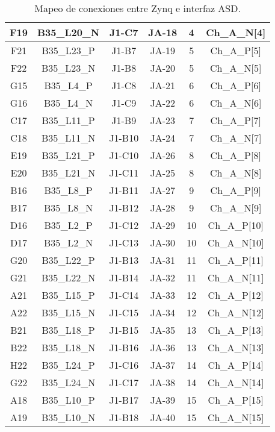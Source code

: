 \begin{table}[]
{\begin{tabular}{|c|c|c|c|c|c|}
				F19 & B35\_L20\_N & J1-C7  & JA-18 & 4  & Ch\_A\_N{[}4{]}  \\ \hline
				\rowcolor[HTML]{D9E1F2} 
				F21 & B35\_L23\_P & J1-B7  & JA-19 & 5  & Ch\_A\_P{[}5{]}  \\ \hline
				F22 & B35\_L23\_N & J1-B8  & JA-20 & 5  & Ch\_A\_N{[}5{]}  \\ \hline
				\rowcolor[HTML]{D9E1F2} 
				G15 & B35\_L4\_P  & J1-C8  & JA-21 & 6  & Ch\_A\_P{[}6{]}  \\ \hline
				G16 & B35\_L4\_N  & J1-C9  & JA-22 & 6  & Ch\_A\_N{[}6{]}  \\ \hline
				\rowcolor[HTML]{D9E1F2} 
				C17 & B35\_L11\_P & J1-B9  & JA-23 & 7  & Ch\_A\_P{[}7{]}  \\ \hline
				C18 & B35\_L11\_N & J1-B10 & JA-24 & 7  & Ch\_A\_N{[}7{]}  \\ \hline
				\rowcolor[HTML]{D9E1F2} 
				E19 & B35\_L21\_P & J1-C10 & JA-26 & 8  & Ch\_A\_P{[}8{]}  \\ \hline
				E20 & B35\_L21\_N & J1-C11 & JA-25 & 8  & Ch\_A\_N{[}8{]}  \\ \hline
				\rowcolor[HTML]{D9E1F2} 
				B16 & B35\_L8\_P  & J1-B11 & JA-27 & 9  & Ch\_A\_P{[}9{]}  \\ \hline
				B17 & B35\_L8\_N  & J1-B12 & JA-28 & 9  & Ch\_A\_N{[}9{]}  \\ \hline
				\rowcolor[HTML]{D9E1F2} 
				D16 & B35\_L2\_P  & J1-C12 & JA-29 & 10 & Ch\_A\_P{[}10{]} \\ \hline
				D17 & B35\_L2\_N  & J1-C13 & JA-30 & 10 & Ch\_A\_N{[}10{]} \\ \hline
				\rowcolor[HTML]{D9E1F2} 
				G20 & B35\_L22\_P & J1-B13 & JA-31 & 11 & Ch\_A\_P{[}11{]} \\ \hline
				G21 & B35\_L22\_N & J1-B14 & JA-32 & 11 & Ch\_A\_N{[}11{]} \\ \hline
				\rowcolor[HTML]{D9E1F2} 
				A21 & B35\_L15\_P & J1-C14 & JA-33 & 12 & Ch\_A\_P{[}12{]} \\ \hline
				A22 & B35\_L15\_N & J1-C15 & JA-34 & 12 & Ch\_A\_N{[}12{]} \\ \hline
				\rowcolor[HTML]{D9E1F2} 
				B21 & B35\_L18\_P & J1-B15 & JA-35 & 13 & Ch\_A\_P{[}13{]} \\ \hline
				B22 & B35\_L18\_N & J1-B16 & JA-36 & 13 & Ch\_A\_N{[}13{]} \\ \hline
				\rowcolor[HTML]{D9E1F2} 
				H22 & B35\_L24\_P & J1-C16 & JA-37 & 14 & Ch\_A\_P{[}14{]} \\ \hline
				G22 & B35\_L24\_N & J1-C17 & JA-38 & 14 & Ch\_A\_N{[}14{]} \\ \hline
				\rowcolor[HTML]{D9E1F2} 
				A18 & B35\_L10\_P & J1-B17 & JA-39 & 15 & Ch\_A\_P{[}15{]} \\ \hline
				A19 & B35\_L10\_N & J1-B18 & JA-40 & 15 & Ch\_A\_N{[}15{]} \\ \hline
			\end{tabular}%
		}
		\caption{Mapeo de conexiones entre Zynq e interfaz ASD. }
		\label{tab:zynq-asd}
	\end{table}
	
